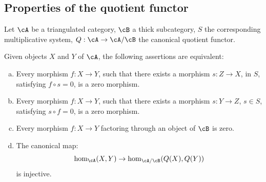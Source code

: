 \subsection{Properties of the quotient functor}\label{VIII:2-5}

Let $\cA$ be a triangulated category, $\cB$ a thick subcategory,
$S$ the corresponding multiplicative system, $Q:\cA\to \cA/\cB$ the canonical
quotient functor. 





\begin{proposition}\label{VIII:2-5-1}
Given objects $X$ and $Y$ of $\cA$, the following assertions are
equivalent:
\begin{enumerate}[(a)]
  \item Every morphism $f:X\to Y$, such that there exists a morphism $s:Z\to X$, in
    $S$, satisfying $f\circ s=0$, is a zero morphism.
  \item Every morphism $f:X\to Y$, such that there exists a morphism $s:Y\to Z$,
    $s\in S$, satisfying $s\circ f=0$, is a zero morphism.
  \item Every morphism $f:X\to Y$ factoring through an object of $\cB$ is
    zero.
  \item The canonical map: 
    \[
      \hom_\cA(X,Y) \to \hom_{\cA/\cB}(Q(X),Q(Y))
    \]
    is injective.
\end{enumerate}
\end{proposition}





